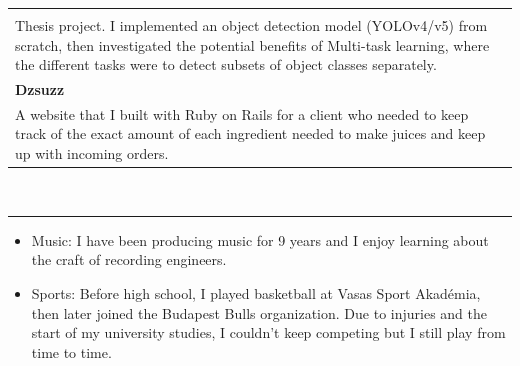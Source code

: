 \documentclass{article}
\begin{document}
\begin{tabular}{l l}
\begin{minipage}{120mm}
        \noindent
        \textbf{Multitask YOLO} \\
        Thesis project. I implemented an object detection model (YOLOv4/v5) from scratch, then investigated the potential benefits of Multi-task learning, where the different tasks were to detect subsets of object classes separately.
        \smallskip \\

        \noindent
        \textbf{Dzsuzz} \\
        A website that I built with Ruby on Rails for a client who needed to keep track of the exact amount of each ingredient needed to make juices and keep up with incoming orders. 
    \end{minipage}
\end{tabular}

\vspace{5mm}
\noindent

 \\
\hrule
\bigskip

\begin{itemize}[leftmargin=5mm]
    \item Music: I have been producing music for 9 years and I enjoy learning about the craft of recording engineers.
    \item Sports: Before high school, I played basketball at Vasas Sport Akadémia, then later joined the Budapest Bulls organization. Due to injuries and the start of my university studies, I couldn't keep competing but I still play from time to time.
\end{itemize}
\end{document}
